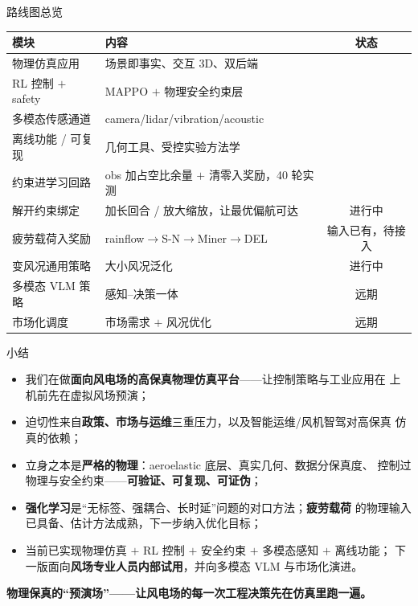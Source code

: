 \documentclass[aspectratio=169,10pt,UTF8]{ctexbeamer}
\newcommand{\hl}[1]{{\color{myblue}\bfseries #1}}
\newcommand{\hlr}[1]{{\color{myred}\bfseries #1}}
\newcommand{\hlg}[1]{{\color{mygreen}\bfseries #1}}
\begin{document}
\begin{frame}{路线图总览}
  \small
  \begin{tabular}{@{}p{} p{} c@{}}
    \toprule
    \textbf{模块} & \textbf{内容} & \textbf{状态}\\
    \midrule
    物理仿真应用 & 场景即事实、交互 3D、双后端 & \hlg{\checkmark}\\
    RL 控制 $+$ safety & MAPPO $+$ 物理安全约束层 & \hlg{\checkmark}\\
    多模态传感通道 & camera/lidar/vibration/acoustic & \hlg{\checkmark}\\
    离线功能 / 可复现 & 几何工具、受控实验方法学 & \hlg{\checkmark}\\
    约束进学习回路 & obs 加占空比余量 $+$ 清零入奖励，40 轮实测 & \hlg{\checkmark}\\
    解开约束绑定 & 加长回合 / 放大缩放，让最优偏航可达 & 进行中\\
    疲劳载荷入奖励 & rainflow$\to$S-N$\to$Miner$\to$DEL & 输入已有，待接入\\
    变风况通用策略 & 大小风况泛化 & 进行中\\
    多模态 VLM 策略 & 感知–决策一体 & 远期\\
    市场化调度 & 市场需求 $+$ 风况优化 & 远期\\
    \bottomrule
  \end{tabular}
\end{frame}

\begin{frame}{小结}
  \begin{itemize}\setlength\itemsep{0.5em}
    \item 我们在做\hl{面向风电场的高保真物理仿真平台}——让控制策略与工业应用在
          上机前先在虚拟风场预演；
    \item 迫切性来自\hl{政策、市场与运维}三重压力，以及智能运维/风机智驾对高保真
          仿真的依赖；
    \item 立身之本是\hlr{严格的物理}：aeroelastic 底层、真实几何、数据分保真度、
          控制过物理与安全约束——\textbf{可验证、可复现、可证伪}；
    \item \hl{强化学习}是“无标签、强耦合、长时延”问题的对口方法；\hl{疲劳载荷}
          的物理输入已具备、估计方法成熟，下一步纳入优化目标；
    \item 当前已实现物理仿真 $+$ RL 控制 $+$ 安全约束 $+$ 多模态感知 $+$ 离线功能；
          下一版面向\hl{风场专业人员内部试用}，并向多模态 VLM 与市场化演进。
  \end{itemize}
  \vfill
  \begin{center}
    \large \hl{物理保真的“预演场”——让风电场的每一次工程决策先在仿真里跑一遍。}
  \end{center}
\end{frame}
\end{document}
